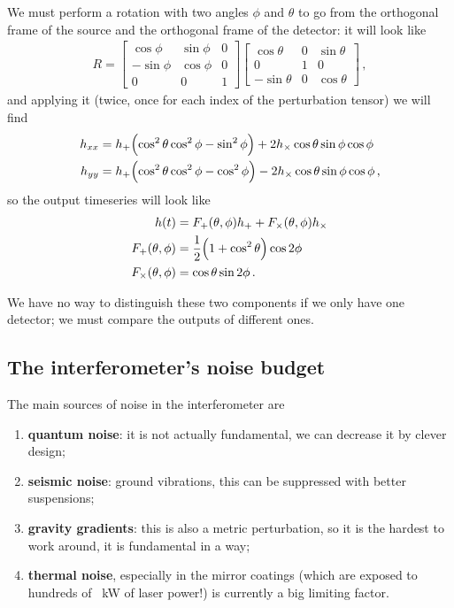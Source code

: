 \documentclass[main.tex]{subfiles}
\begin{document}
We must perform a rotation with two angles \(\phi \) and \(\theta \) to go from the orthogonal frame of the source and the orthogonal frame of the detector: it will look like 
%
\begin{align}
R = \left[\begin{array}{ccc}
\cos \phi  & \sin \phi  & 0 \\ 
- \sin \phi  & \cos \phi  & 0 \\ 
0 & 0 & 1
\end{array}\right]
\left[\begin{array}{ccc}
\cos \theta  & 0 & \sin \theta  \\ 
0 & 1 & 0 \\ 
-\sin \theta  & 0 & \cos \theta 
\end{array}\right]
\,,
\end{align}
%
and applying it (twice, once for each index of the perturbation tensor) we will find 
%
\begin{align}
h_{xx} &= h_{+} \qty(\cos^2\theta  \cos^2\phi - \sin^2 \phi ) + 2 h_{\times } \cos \theta \sin \phi \cos \phi   \\
h_{yy} &= h_{+} \qty(\cos^2\theta \cos^2\phi  - \cos^2\phi )
- 2 h_{\times}  \cos \theta \sin \phi \cos \phi 
\,,
\end{align}
%
so the output timeseries will look like 
%
\begin{align}
h(t) &=  F_{+} (\theta, \phi ) h_{+} + F_\times (\theta , \phi ) h_{\times }  \\
F_{+} (\theta, \phi ) &= \frac{1}{2} \qty(1 + \cos^2 \theta ) \cos 2 \phi  \\
F_{\times} (\theta, \phi ) &= \cos \theta \sin 2 \phi 
\,.
\end{align}

We have no way to distinguish these two components if we only have one detector; we must compare the outputs of different ones. 

\subsection{The interferometer's noise budget}

The main sources of noise in the interferometer are 
\begin{enumerate}
    \item \textbf{quantum noise}: it is not actually fundamental, we can decrease it by clever design;
    \item \textbf{seismic noise}: ground vibrations, this can be suppressed with better suspensions;
    \item \textbf{gravity gradients}: this is also a metric perturbation, so it is the hardest to work around, it is fundamental in a way;
    \item \textbf{thermal noise}, especially in the mirror coatings (which are exposed to hundreds of \SI{}{kW} of laser power!) is currently a big limiting factor.
\end{enumerate}
\end{document}
